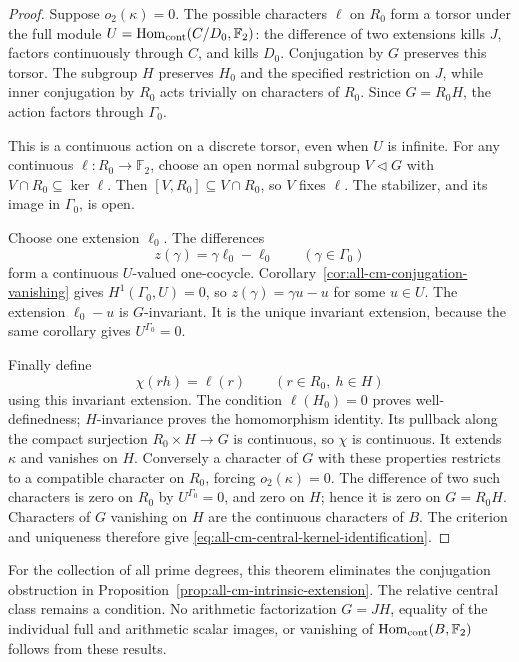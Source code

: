 \begin{proof}
Suppose \(o_2(\kappa)=0\).
The possible characters \(\ell\) on \(R_0\) form a torsor
under the full module
\(U=\operatorname{Hom}_{\rm cont}(C/D_0,\mathbb F_2)\):
the difference of two extensions kills \(J\), factors
continuously through \(C\), and kills \(D_0\).
Conjugation by \(G\) preserves this torsor.
The subgroup \(H\) preserves \(H_0\) and the specified
restriction on \(J\), while inner conjugation by \(R_0\)
acts trivially on characters of \(R_0\).
Since \(G=R_0H\), the action factors through \(\Gamma_0\).

This is a continuous action on a discrete torsor, even
when \(U\) is infinite.
For any continuous \(\ell:R_0\to\mathbb F_2\), choose an
open normal subgroup \(V\triangleleft G\) with
\(V\cap R_0\subseteq\ker\ell\).
Then \([V,R_0]\subseteq V\cap R_0\), so \(V\) fixes \(\ell\).
The stabilizer, and its image in \(\Gamma_0\), is open.

Choose one extension \(\ell_0\).
The differences
\[
                         z(\gamma)=\gamma\ell_0-\ell_0
                                      \qquad(\gamma\in\Gamma_0)
\]
form a continuous \(U\)-valued one-cocycle.
Corollary~\ref{cor:all-cm-conjugation-vanishing} gives
\(H^1(\Gamma_0,U)=0\), so
\(z(\gamma)=\gamma u-u\) for some \(u\in U\).
The extension \(\ell_0-u\) is \(G\)-invariant.
It is the unique invariant extension, because the same
corollary gives \(U^{\Gamma_0}=0\).

Finally define
\[
                         \chi(rh)=\ell(r)
                            \qquad(r\in R_0,\ h\in H)
\]
using this invariant extension.
The condition \(\ell(H_0)=0\) proves well-definedness;
\(H\)-invariance proves the homomorphism identity.
Its pullback along the compact surjection
\(R_0\times H\to G\) is continuous, so \(\chi\) is continuous.
It extends \(\kappa\) and vanishes on \(H\).
Conversely a character of \(G\) with these properties
restricts to a compatible character on \(R_0\), forcing
\(o_2(\kappa)=0\).
The difference of two such characters is zero on \(R_0\)
by \(U^{\Gamma_0}=0\), and zero on \(H\); hence it is zero
on \(G=R_0H\).
Characters of \(G\) vanishing on \(H\) are the continuous
characters of \(B\). The criterion and uniqueness therefore
give \eqref{eq:all-cm-central-kernel-identification}.
\end{proof}

For the collection of all prime degrees, this theorem
eliminates the conjugation obstruction in
Proposition~\ref{prop:all-cm-intrinsic-extension}.
The relative central class remains a condition.
No arithmetic factorization \(G=JH\), equality of the
individual full and arithmetic scalar images, or
vanishing of \(\operatorname{Hom}_{\rm cont}(B,\mathbb F_2)\)
follows from these results.


